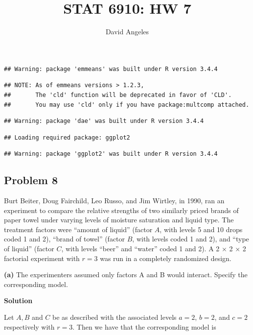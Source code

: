 \documentclass[12pt,]{article}
\title{STAT 6910: HW 7}
\author{David Angeles}
\date{}
\begin{document}
\maketitle

\begin{verbatim}
## Warning: package 'emmeans' was built under R version 3.4.4
\end{verbatim}

\begin{verbatim}
## NOTE: As of emmeans versions > 1.2.3,
##       The 'cld' function will be deprecated in favor of 'CLD'.
##       You may use 'cld' only if you have package:multcomp attached.
\end{verbatim}

\begin{verbatim}
## Warning: package 'dae' was built under R version 3.4.4
\end{verbatim}

\begin{verbatim}
## Loading required package: ggplot2
\end{verbatim}

\begin{verbatim}
## Warning: package 'ggplot2' was built under R version 3.4.4
\end{verbatim}

\subsection{Problem 8}\label{problem-8}

Burt Beiter, Doug Fairchild, Leo Russo, and Jim Wirtley, in 1990, ran an
experiment to compare the relative strengths of two similarly priced
brands of paper towel under varying levels of moisture saturation and
liquid type. The treatment factors were ``amount of liquid'' (factor
\(A\), with levels 5 and 10 drops coded 1 and 2), ``brand of towel''
(factor \(B\), with levels coded 1 and 2), and ``type of liquid''
(factor \(C\), with levels ``beer'' and ``water'' coded 1 and 2). A 2 ×
2 × 2 factorial experiment with \(r = 3\) was run in a completely
randomized design.

\textbf{(a)} The experimenters assumed only factors A and B would
interact. Specify the corresponding model.

\textbf{Solution}

Let \(A, B\) and \(C\) be as described with the associated levels
\(a= 2\), \(b = 2\), and \(c= 2\) respectively with \(r=3\). Then we
have that the corresponding model is
\end{document}
